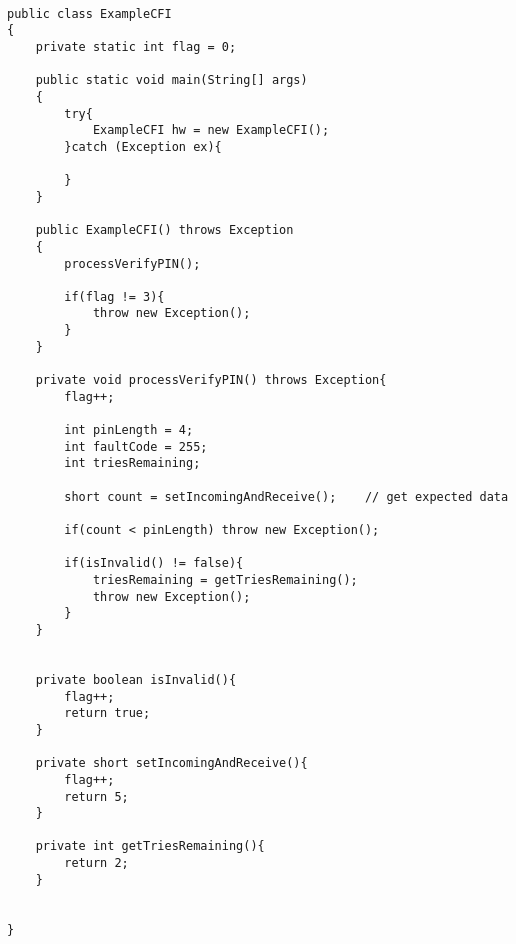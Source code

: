 \begin{lstlisting}[caption={Java code example of the control flow integrity countermeasure},label={lst:examplecfi}]

public class ExampleCFI
{
    private static int flag = 0;
	
    public static void main(String[] args) 
    {
        try{
            ExampleCFI hw = new ExampleCFI();
        }catch (Exception ex){

        }
    }

    public ExampleCFI() throws Exception
    {
        processVerifyPIN();
		
        if(flag != 3){
            throw new Exception();
        }
    }

    private void processVerifyPIN() throws Exception{
        flag++;
		
        int pinLength = 4;
        int faultCode = 255;
        int triesRemaining;

        short count = setIncomingAndReceive();    // get expected data
		
        if(count < pinLength) throw new Exception();

        if(isInvalid() != false){
            triesRemaining = getTriesRemaining();
            throw new Exception();
        }
    }


    private boolean isInvalid(){
        flag++;
        return true;
    }

    private short setIncomingAndReceive(){
        flag++;
        return 5;
    }

    private int getTriesRemaining(){
        return 2;
    }


}
\end{lstlisting}